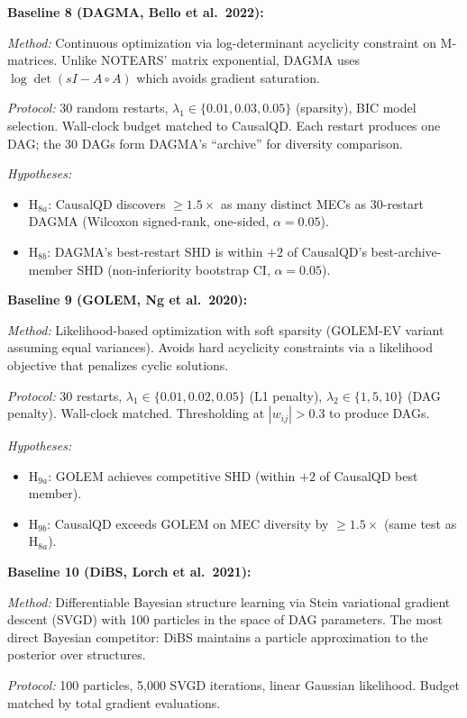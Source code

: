 \documentclass{article}
\theoremstyle{definition}
\theoremstyle{plain}
\theoremstyle{remark}
\begin{document}
\textbf{Baseline 8 (DAGMA, Bello et al.\ 2022):}

\emph{Method:} Continuous optimization via log-determinant acyclicity
constraint on M-matrices. Unlike NOTEARS' matrix exponential,
DAGMA uses $\log\det(sI - A \circ A)$ which avoids gradient saturation.

\emph{Protocol:} 30 random restarts, $\lambda_1 \in \{0.01, 0.03, 0.05\}$
(sparsity), BIC model selection. Wall-clock budget matched to CausalQD.
Each restart produces one DAG; the 30 DAGs form DAGMA's ``archive'' for
diversity comparison.

\emph{Hypotheses:}
\begin{itemize}
  \item H$_{8a}$: CausalQD discovers $\geq 1.5\times$ as many distinct
    MECs as 30-restart DAGMA (Wilcoxon signed-rank, one-sided,
    $\alpha = 0.05$).
  \item H$_{8b}$: DAGMA's best-restart SHD is within $+2$ of CausalQD's
    best-archive-member SHD (non-inferiority bootstrap CI, $\alpha = 0.05$).
\end{itemize}

\textbf{Baseline 9 (GOLEM, Ng et al.\ 2020):}

\emph{Method:} Likelihood-based optimization with soft sparsity
(GOLEM-EV variant assuming equal variances). Avoids hard acyclicity
constraints via a likelihood objective that penalizes cyclic solutions.

\emph{Protocol:} 30 restarts, $\lambda_1 \in \{0.01, 0.02, 0.05\}$
(L1 penalty), $\lambda_2 \in \{1, 5, 10\}$ (DAG penalty).
Wall-clock matched. Thresholding at $|w_{ij}| > 0.3$ to produce DAGs.

\emph{Hypotheses:}
\begin{itemize}
  \item H$_{9a}$: GOLEM achieves competitive SHD (within $+2$ of CausalQD
    best member).
  \item H$_{9b}$: CausalQD exceeds GOLEM on MEC diversity by
    $\geq 1.5\times$ (same test as H$_{8a}$).
\end{itemize}

\textbf{Baseline 10 (DiBS, Lorch et al.\ 2021):}

\emph{Method:} Differentiable Bayesian structure learning via Stein
variational gradient descent (SVGD) with 100 particles in the space of
DAG parameters. The most direct Bayesian competitor: DiBS maintains a
particle approximation to the posterior over structures.

\emph{Protocol:} 100 particles, 5{,}000 SVGD iterations, linear Gaussian
likelihood. Budget matched by total gradient evaluations.
\end{document}
